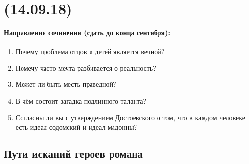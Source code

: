 \documentclass{article}
\begin{document}
\newpage
\noindent\makebox[\linewidth]{\rule{\paperwidth}{0.4pt}}
\section{(14.09.18)}
\noindent\makebox[\linewidth]{\rule{\paperwidth}{0.4pt}}
\paragraph{}

\paragraph{Направления сочинения (сдать до конца сентября):}

\begin{enumerate}
\item
  Почему проблема отцов и детей является вечной?
\item
  Помечу часто мечта разбивается о реальность?
\item
  Может ли быть месть праведной?
\item
  В чём состоит загадка подлинного таланта?
\item
  Согласны ли вы с утверждением Достоевского о том, что в каждом человеке есть идеал содомский и идеал мадонны?
\end{enumerate}
\paragraph{}

\subsection{Пути исканий героев романа}
\end{document}
